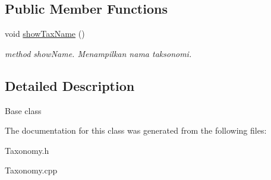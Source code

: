 \subsection*{Public Member Functions}
\begin{DoxyCompactItemize}
\item 
void \hyperlink{classPisces_a7173ad0c2d6735f3de8c3e1d931c5c41}{show\+Tax\+Name} ()\hypertarget{classPisces_a7173ad0c2d6735f3de8c3e1d931c5c41}{}\label{classPisces_a7173ad0c2d6735f3de8c3e1d931c5c41}

\begin{DoxyCompactList}\small\item\em method show\+Name. Menampilkan nama taksonomi. \end{DoxyCompactList}\end{DoxyCompactItemize}


\subsection{Detailed Description}
Base class 

The documentation for this class was generated from the following files\+:\begin{DoxyCompactItemize}
\item 
Taxonomy.\+h\item 
Taxonomy.\+cpp\end{DoxyCompactItemize}
